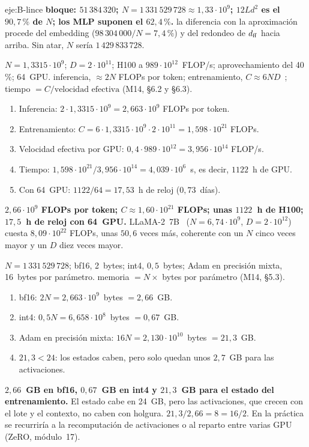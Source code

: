 \begin{solucion}{eje:B-lince}
\resultado \textbf{bloque: $51\,384\,320$; $N=1\,331\,529\,728\approx 1{,}33\cdot 10^{9}$; $12Ld^{2}$ es el $90{,}7\,\%$ de $N$; los MLP suponen el $62{,}4\,\%$.}
\comprobacion la diferencia con la aproximación procede del embedding ($98\,304\,000/N=7{,}4\,\%$) y del redondeo de $d_{\mathrm{ff}}$ hacia arriba. Sin atar, $N$ sería $1\,429\,833\,728$.

\datos $N=1{,}3315\cdot 10^{9}$; $D=2\cdot 10^{11}$; H100 a $989\cdot 10^{12}$~FLOP/s; aprovechamiento del 40\,\%; 64~GPU.
\planteamiento inferencia, $\approx 2N$ FLOPs por token; entrenamiento, $C\approx 6ND$~\cite{kaplan}; tiempo $=C/\text{velocidad efectiva}$ (M14, §6.2 y §6.3).
\pasos
\begin{enumerate}[label=\arabic*.]
  \item Inferencia: $2\cdot 1{,}3315\cdot 10^{9}=2{,}663\cdot 10^{9}$ FLOPs por token.
  \item Entrenamiento: $C=6\cdot 1{,}3315\cdot 10^{9}\cdot 2\cdot 10^{11}=1{,}598\cdot 10^{21}$ FLOPs.
  \item Velocidad efectiva por GPU: $0{,}4\cdot 989\cdot 10^{12}=3{,}956\cdot 10^{14}$ FLOP/s.
  \item Tiempo: $1{,}598\cdot 10^{21}/3{,}956\cdot 10^{14}=4{,}039\cdot 10^{6}$~s, es decir, $1122$~h de GPU.
  \item Con 64~GPU: $1122/64=17{,}53$~h de reloj ($0{,}73$~días).
\end{enumerate}
\resultado \textbf{$2{,}66\cdot 10^{9}$ FLOPs por token; $C\approx 1{,}60\cdot 10^{21}$ FLOPs; unas $1122$~h de H100; $17{,}5$~h de reloj con 64~GPU.}
\comprobacion LLaMA-2~7B~\cite{llama2} ($N=6{,}74\cdot 10^{9}$, $D=2\cdot 10^{12}$) cuesta $8{,}09\cdot 10^{22}$ FLOPs, unas $50{,}6$ veces más, coherente con un $N$ cinco veces mayor y un $D$ diez veces mayor.

\datos $N=1\,331\,529\,728$; bf16, 2~bytes; int4, $0{,}5$~bytes; Adam en precisión mixta, 16~bytes por parámetro.
\planteamiento memoria $=N\times$ bytes por parámetro (M14, §5.3).
\pasos
\begin{enumerate}[label=\arabic*.]
  \item bf16: $2N=2{,}663\cdot 10^{9}$~bytes $=2{,}66$~GB.
  \item int4: $0{,}5N=6{,}658\cdot 10^{8}$~bytes $=0{,}67$~GB.
  \item Adam en precisión mixta: $16N=2{,}130\cdot 10^{10}$~bytes $=21{,}3$~GB.
  \item $21{,}3<24$: los estados caben, pero solo quedan unos $2{,}7$~GB para las activaciones.
\end{enumerate}
\resultado \textbf{$2{,}66$~GB en bf16, $0{,}67$~GB en int4 y $21{,}3$~GB para el estado del entrenamiento.} El estado cabe en 24~GB, pero las activaciones, que crecen con el lote y el contexto, no caben con holgura.
\comprobacion $21{,}3/2{,}66=8=16/2$. En la práctica se recurriría a la recomputación de activaciones o al reparto entre varias GPU (ZeRO, módulo~17).


\end{solucion}
